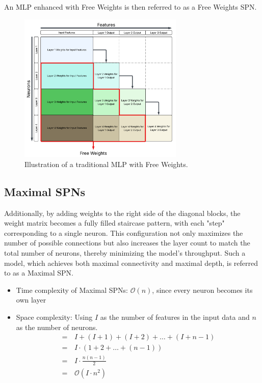 An MLP enhanced with Free Weights is then referred to as a Free Weights SPN.

\begin{figure}[h!]
\centering
\includegraphics[width=0.7\textwidth]{Figures/Methodology/Free_Weights_SPN_Weights.png}
\caption{Illustration of a traditional MLP with Free Weights.}
\label{fig:fwSpn}
\end{figure}

\subsection{Maximal SPNs}

Additionally, by adding weights to the right side of the diagonal blocks, the weight matrix becomes a fully filled staircase pattern, with each "step" corresponding to a single neuron. This configuration not only maximizes the number of possible connections but also increases the layer count to match the total number of neurons, thereby minimizing the model’s throughput. Such a model, which achieves both maximal connectivity and maximal depth, is referred to as a Maximal SPN.

\begin{itemize}
    \item Time complexity of Maximal SPNs: $\mathcal{O}(n)$, since every neuron becomes its own layer
    \item Space complexity: Using $I$ as the number of features in the input data and $n$ as the number of neurons.
    \begin{align*}
    =\, & I + (I+1) + (I+2) + \dots + (I + n - 1) \\
    =\, & I \cdot (1 + 2 + \dots + (n-1)) \\
    =\, & I \cdot \frac{n(n-1)}{2} \\
    =\, & \mathcal{O}(I \cdot n^2)
    \end{align*}
\end{itemize}

